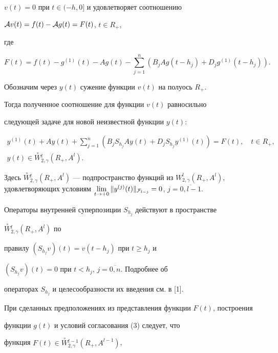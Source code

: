 $v(t)=0$ при $t\in (-h,0]$ и удовлетворяет соотношению


${{\cal A}}v(t)=f(t)-{{\cal A}}g(t)=F(t)$, $t\in R_+$,


где


$$


F(t)=f(t)-g^{(1)}(t)-Ag(t)-\sum_{j=1}^n(B_jAg(t-h_j)+D_jg^{(1)}(t-h_j)).


$$





Обозначим через $y(t)$ сужение функции $v(t)$ на полуось $R_+$.


Тогда полученное соотношение для функции $v(t)$ равносильно


следующей задаче для новой неизвестной функции $y(t)$:


\begin{gather}


y^{(1)}(t)+Ay(t)+\sum\limits_{j=1}^n(B_jS_{h_j}Ay(t)+


D_jS_{h_j}y^{(1)}(t))=F(t),\quad t\in R_+, \\


%


y(t)\in \overset{\circ}{W}{}^l_{2,\gamma}(R_+,A^l). 


\end{gather}


Здесь $\overset{\circ}{W}{}^l_{2,\gamma


}(R_+,A^l)$ --- подпространство функций из $W^l_{2,\gamma


}(R_+,A^l)$, удовлетворяющих условиям $\lim\limits_{t\to


+0}\|y^{(j)}(t)\|_{{\pF}_{l-j}}=0$, $j=\overline{0,l-1}$.


Операторы внутренней суперпозиции $S_{h_j}$ действуют в пространстве


$\overset{\circ}{W}{}^{l}_{2,\gamma }(R_+,A^l)$ по


правилу $(S_{h_j}v)(t)=v(t-h_j)$ при $t\geq h_j$ и


$(S_{h_j}v)(t)=0$ при $t<h_j$, $j=\overline{0,n}$. Подробнее об


операторах $S_{h_j}$ и целесообразности их введения см. в [1].





При сделанных предположениях из представления функции $F(t)$, построения


функции $g(t)$ и условий согласования (3) следует, что


функция $F(t)\in \overset{\circ}{W}{}^{l-1}_{2,\gamma } (R_+,A^{l-1})$,


